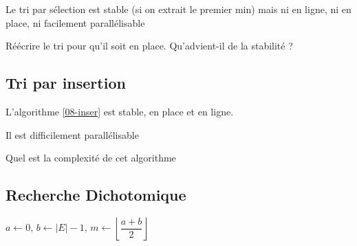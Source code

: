 \begin{proposition}
	Le tri par sélection est stable (si on extrait le premier min) mais ni en ligne, ni en place, ni facilement parallélisable
\end{proposition}

\begin{exercise}
	Réécrire le tri pour qu'il soit en place. Qu'advient-il de la stabilité ?
\end{exercise}

\subsection{Tri par insertion}

\begin{algorithm}[H]
	\caption{$Tri\_par\_insertion$}
	\label{08-inser}
\end{algorithm}

\begin{proposition}
	L'algorithme \ref{08-inser} est stable, en place et en ligne.
\end{proposition}

\begin{rem}
	Il est difficilement parallélisable
\end{rem}

\begin{exercise}
	Quel est la complexité de cet algorithme
\end{exercise}

\subsection{Recherche Dichotomique}

\begin{algorithm}[H]
	\caption{$Recherche\_dichotomique(E, x)$}
	{
	}
	{
		$a \gets 0, \, b \gets |E|-1, \, m \gets \left\lfloor \dfrac{a+b}{2} \right\rfloor$\\
			{}
			{}
	}
\end{algorithm}


